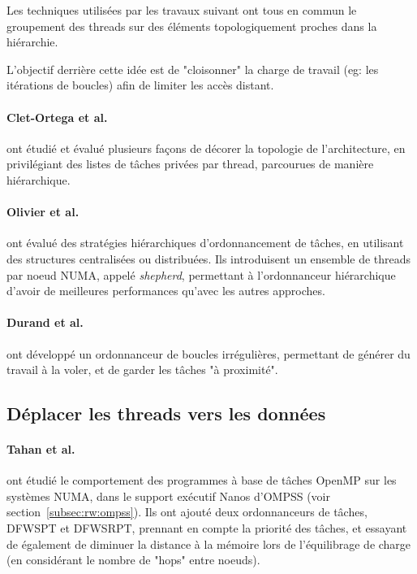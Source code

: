 Les techniques utilisées par les travaux suivant ont tous en commun le groupement des threads sur des éléments topologiquement proches dans la hiérarchie.

L'objectif derrière cette idée est de "cloisonner" la charge de travail (eg: les itérations de boucles) afin de limiter les accès distant.

\paragraph{Clet-Ortega et al.~\cite{Clet2014}} ont étudié et évalué plusieurs façons de décorer la topologie de l'architecture, en privilégiant des listes de tâches privées par thread, parcourues de manière hiérarchique.

\paragraph{Olivier et al.~\cite{Olivier2012}} ont évalué des stratégies hiérarchiques d'ordonnancement de tâches, en utilisant des structures centralisées ou distribuées.
Ils introduisent un ensemble de threads par noeud NUMA, appelé \emph{shepherd}, permettant à l'ordonnanceur hiérarchique d'avoir de meilleures performances qu'avec les autres approches.


\paragraph{Durand et al.~\cite{Durand2013}} ont développé un ordonnanceur de boucles irrégulières, permettant de générer du travail à la voler, et de garder les tâches "à proximité".




\subsection{Déplacer les threads vers les données}







\paragraph{Tahan et al.~\cite{Tahan2014}} ont étudié le comportement des programmes à base de tâches OpenMP sur les systèmes NUMA, dans le support exécutif Nanos d'OMPSS (voir section~\ref{subsec:rw:ompss}).
Ils ont ajouté deux ordonnanceurs de tâches, DFWSPT et DFWSRPT, prennant en compte la priorité des tâches, et essayant de également de diminuer la distance à la mémoire lors de l'équilibrage de charge (en considérant le nombre de "hops" entre noeuds).

